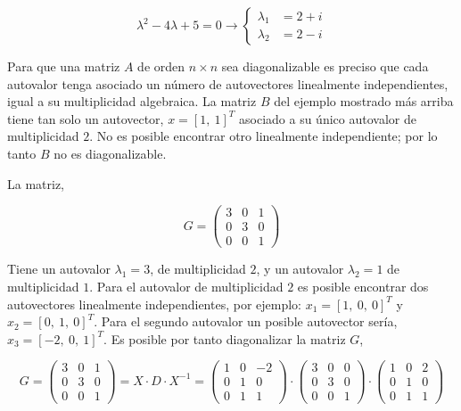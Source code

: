 \begin{equation*}
\lambda^2-4\lambda+5=0 \rightarrow \left\{ 
\begin{aligned}
\lambda_1&=2+i\\
\lambda_2&=2-i
\end{aligned}
\right.
\end{equation*}
\begin{paracol}{2}
Para que una matriz $A$ de orden $n\times n$ sea diagonalizable es preciso que cada autovalor tenga asociado un número de autovectores linealmente independientes, igual a su multiplicidad algebraica. La matriz $B$ del ejemplo mostrado más arriba tiene tan solo un autovector, $x=[1,\ 1]^T$ asociado a su único autovalor de multiplicidad $2$. No es posible encontrar otro linealmente independiente; por lo tanto $B$ no es diagonalizable. 

La matriz,
\end{paracol}
\begin{equation*}
G=\begin{pmatrix}
3& 0& 1\\
0& 3& 0\\
0& 0& 1
\end{pmatrix}
\end{equation*}
\begin{paracol}{2}
Tiene un autovalor $\lambda_1=3$, de multiplicidad $2$, y un autovalor $\lambda_2=1$ de multiplicidad $1$. Para el autovalor de multiplicidad $2$ es posible encontrar dos autovectores linealmente independientes, por ejemplo: $x_1=[1,\ 0,\ 0]^T$ y $x_2=[0,\ 1,\ 0]^T$. Para el segundo autovalor un posible autovector sería, $x_3=[-2,\ 0,\ 1]^T$. Es posible por tanto diagonalizar la matriz $G$,
\end{paracol}
\begin{equation*}
G=\begin{pmatrix}
3& 0& 1\\
0& 3& 0\\
0& 0& 1
\end{pmatrix}=X\cdot D \cdot X^{-1}=\begin{pmatrix}
1& 0& -2\\
0& 1& 0\\
0& 1& 1
\end{pmatrix}\cdot\begin{pmatrix}
3& 0& 0\\
0& 3& 0\\
0& 0& 1
\end{pmatrix}\cdot \begin{pmatrix}
1& 0& 2\\
0& 1& 0\\
0& 1& 1
\end{pmatrix}
\end{equation*}
